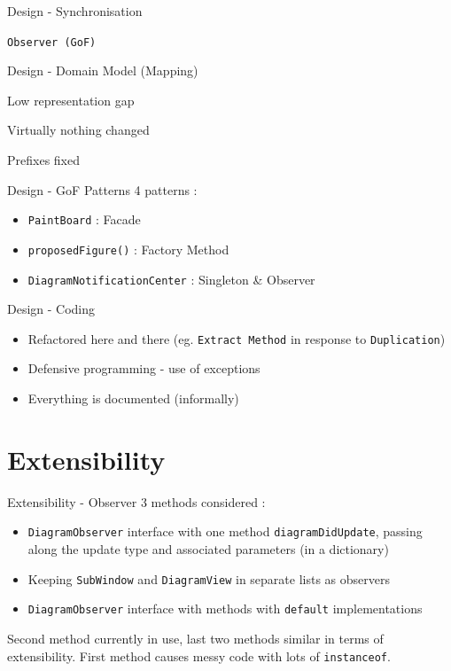 \documentclass[10pt]{beamer}
\begin{document}
\begin{frame}[fragile]{Design - Synchronisation}
\begin{center}
\vspace{1cm}
\texttt{Observer (GoF)}
\end{center}
\end{frame}

\begin{frame}[fragile]{Design - Domain Model (Mapping)}
	\begin{center}
	\item Low representation gap
	\item Virtually nothing changed
	\item Prefixes fixed
	\end{center}
\end{frame}

\begin{frame}[fragile]{Design - GoF Patterns}
4 patterns :
\begin{itemize}
\item \texttt{PaintBoard} : Facade
\item \texttt{proposedFigure()} : Factory Method
\item \texttt{DiagramNotificationCenter} : Singleton \& Observer
\end{itemize}
\end{frame}

\begin{frame}[fragile]{Design - Coding}
\begin{itemize}
\item Refactored here and there (eg. \texttt{Extract Method} in response to \texttt{Duplication})
\item Defensive programming - use of exceptions
\item Everything is documented (informally)
\end{itemize}
\end{frame}

\section{Extensibility}

\begin{frame}[fragile]{Extensibility - Observer}
3 methods considered :
\begin{itemize}
\item \texttt{DiagramObserver} interface with one method \texttt{diagramDidUpdate}, passing along the update type and associated parameters (in a dictionary)
\item Keeping \texttt{SubWindow} and \texttt{DiagramView} in separate lists as observers
\item \texttt{DiagramObserver} interface with methods with \texttt{default} implementations
\end{itemize}
Second method currently in use, last two methods similar in terms of extensibility. First method causes messy code with lots of \texttt{instanceof}.
\end{frame}
\end{document}
